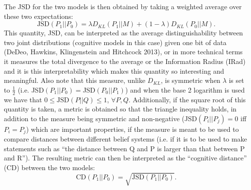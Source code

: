 \documentclass[12pt]{article}
\begin{document}
The JSD for the two models is then obtained by taking a weighted average over these two expectations:
\begin{equation} \label{eq:jsd}
\text{JSD}(P_1 | | P_0)=\lambda D_{KL}(P_1 | | M) + (1-\lambda) D_{KL}(P_0 | | M).
\end{equation}
This quantity, JSD, can be interpreted as the average distinguishability between two joint distributions (cognitive models in this case) given one bit of data (DeDeo, Hawkins, Klingenstein and Hitchcock 2013), or in more technical terms it measures the total divergence to the average or the Information Radius (IRad) and it is this interpretability which makes this quantity so interesting and meaningful.  Also note that this measure, unlike $D_{KL}$, is symmetric when $\lambda$ is set to $\frac{1}{2}$ (i.e. JSD$(P_1 | | P_0)=$JSD$(P_0 | | P_1)$) and when the base 2 logarithm is used we have that $0 \leq \text{JSD}(P | | Q) \leq 1$, $\forall P, Q.$ Additionally, if the square root of this quantity is taken, a metric is obtained so that the triangle inequality holds, in addition to the measure being symmetric and non-negative (JSD$(P_i || P_j)=0$ iff $P_i=P_j$) which are important properties, if the measure is meant to be used to compare distances between different belief systems (i.e. if it is to be used to make statements such as ``the distance between Q and P is larger than that between P and R''). The resulting metric can then be interpreted as the ``cognitive distance'' (CD) between the two models:
\begin{equation} \label{eq:distance}
\text{CD}(P_1 || P_0)=\sqrt{\text{JSD}(P_1 || P_0)}.
\end{equation}
\end{document}
